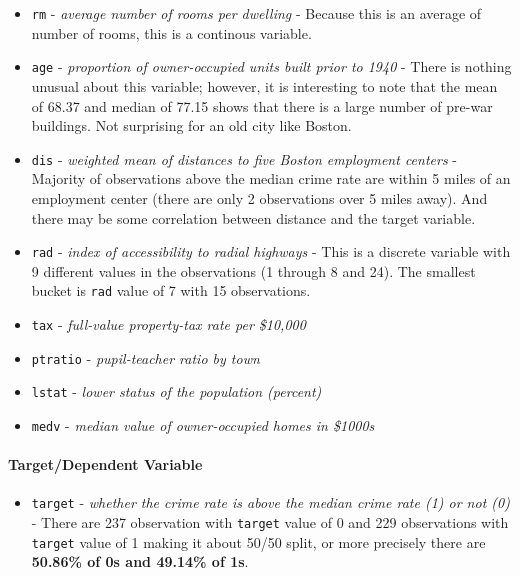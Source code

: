 \documentclass[]{article}
\providecommand{\tightlist}{%
  \setlength{\itemsep}{0pt}\setlength{\parskip}{0pt}}
\let\oldparagraph\paragraph
\renewcommand{\paragraph}[1]{\oldparagraph{#1}\mbox{}}
\begin{document}
\begin{itemize}
\tightlist
\item
  \texttt{rm} - \emph{average number of rooms per dwelling} - Because
  this is an average of number of rooms, this is a continous variable.
\item
  \texttt{age} - \emph{proportion of owner-occupied units built prior to
  1940} - There is nothing unusual about this variable; however, it is
  interesting to note that the mean of 68.37 and median of 77.15 shows
  that there is a large number of pre-war buildings. Not surprising for
  an old city like Boston.
\item
  \texttt{dis} - \emph{weighted mean of distances to five Boston
  employment centers} - Majority of observations above the median crime
  rate are within 5 miles of an employment center (there are only 2
  observations over 5 miles away). And there may be some correlation
  between distance and the target variable.
\item
  \texttt{rad} - \emph{index of accessibility to radial highways} - This
  is a discrete variable with 9 different values in the observations (1
  through 8 and 24). The smallest bucket is \texttt{rad} value of 7 with
  15 observations.
\item
  \texttt{tax} - \emph{full-value property-tax rate per \$10,000}
\item
  \texttt{ptratio} - \emph{pupil-teacher ratio by town}
\item
  \texttt{lstat} - \emph{lower status of the population (percent)}
\item
  \texttt{medv} - \emph{median value of owner-occupied homes in \$1000s}
\end{itemize}

\hypertarget{targetdependent-variable}{%
\paragraph{Target/Dependent Variable}\label{targetdependent-variable}}

\begin{itemize}
\tightlist
\item
  \texttt{target} - \emph{whether the crime rate is above the median
  crime rate (1) or not (0)} - There are 237 observation with
  \texttt{target} value of 0 and 229 observations with \texttt{target}
  value of 1 making it about 50/50 split, or more precisely there are
  \textbf{50.86\% of 0s and 49.14\% of 1s}.
\end{itemize}
\end{document}
